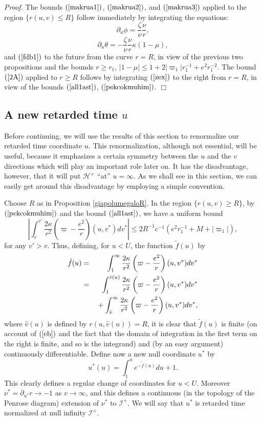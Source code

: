 \documentclass{article}
\newcommand{\zn}{\frac{\zeta}{\nu}}
\begin{document}
\noindent\emph{Proof.} The bounds $(\ref{makrua1})$, $(\ref{makrua2})$,
and $(\ref{makrua3})$ applied to the region $\{r(u,v)\le R\}$ 
follow immediately by integrating
the equations:
\[
\partial_u\phi=\zn\frac{\nu}r,
\]
\[
\partial_u\theta=-\zn\frac\nu{r}\kappa(1-\mu),
\]
and $(\ref{fdb1})$
to the future 
from the curve $r=R$, in view of the
previous two propositions and the bounds 
$r\ge r_1$, $|1-\mu|\le1+2|\varpi_1|r_1^{-1}+e^2r_1^{-2}$.
The bound $(\ref{2A})$ applied to $r\ge R$ follows by integrating $(\ref{zex})$ to the right
from $r=R$, in view of the
bounds $(\ref{all1ast})$, $(\ref{pekcokmuhim})$.
$\Box$

\subsection{A new retarded time $u$}
\label{veosxrovos}
Before continuing, we will use the results of this section
to renormalize our retarded time coordinate $u$. This renormalization,
although not essential,
will be useful, because it emphasizes a certain symmetry between the $u$ and 
the $v$ directions which will play
an important role later on. It has the disadvantage, however, that it will put
$\mathcal{H}^+$ ``at'' $u=\infty$. As we shall see in this section,
we can easily get around this disadvantage by employing a simple convention.

Choose $R$ as in Proposition \ref{giapolumegaloR}.
In the region $\{r(u,v)\ge R\}$, 
by $(\ref{pekcokmuhim})$ and the bound
$(\ref{all1ast})$, we have a
uniform bound
\begin{equation}
\label{eb}
\left|\int_v^{v'}{\frac{2\kappa}{r^2}\left(\varpi-\frac {e^2}r\right)
(u,v^*)dv^*}\right|\le 2R^{-1}c^{-1}(e^2r_1^{-1}+M+|\varpi_1|),
\end{equation}
for any $v'>v$.
Thus, defining, for $u<U$, the function $\tilde{f}(u)$ by
\begin{eqnarray*}
\tilde{f}(u)&=&
\int_1^{\infty}{\frac{2\kappa}{r^2}\left(\varpi-\frac {e^2}r\right)
(u,v^*)dv^*}\\
&=&
\int_1^{\hat{v}(u)}{\frac{2\kappa}{r^2}\left(\varpi-\frac {e^2}r\right)
(u,v^*)dv^*}\\
&&\hbox{}+
\int_{\hat{v}}^{\infty}{\frac{2\kappa}{r^2}\left(\varpi-\frac {e^2}r\right)
(u,v^*)dv^*},
\end{eqnarray*}
where $\hat{v}(u)$ is defined by $r(u,\hat{v}(u))=R$,
it is clear that $\tilde{f}(u)$ is finite (on account of $(\ref{eb})$ and the 
fact that the domain of integration in the first term on the right is finite,
and so is the integrand) and (by an easy argument) 
continuously differentiable.
Define now a new null coordinate $u^*$ by
\[
u^*(u)=\int_1^u{e^{-\tilde{f}(u)}du}+1.
\]
This clearly defines a regular change of coordinates for $u<U$.
Moreover $\nu^*=\partial_{u^*}r\to-1$ as $v\to\infty$,
and this defines a continuous (in the topology of the Penrose diagram)
extension of $\nu^*$ to $\mathcal{I}^+$. 
We will
say that $u^*$ is retarded time normalized at null infinity $\mathcal{I}^+$.
\end{document}
